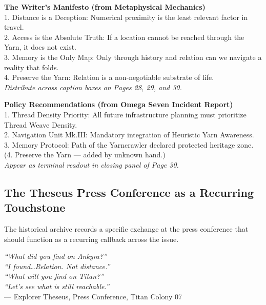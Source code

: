 \documentclass[11pt]{article}
\begin{document}
\begin{archivebox}
\textcolor{archiveGold}{\textbf{The Writer's Manifesto (from Metaphysical Mechanics)}}\\[4pt]
\small
1. Distance is a Deception: Numerical proximity is the least relevant factor in travel.\\
2. Access is the Absolute Truth: If a location cannot be reached through the Yarn, it does not exist.\\
3. Memory is the Only Map: Only through history and relation can we navigate a reality that folds.\\
4. Preserve the Yarn: Relation is a non-negotiable substrate of life.\\[4pt]
\textit{Distribute across caption boxes on Pages 28, 29, and 30.}
\end{archivebox}

\begin{archivebox}
\textcolor{archiveGold}{\textbf{Policy Recommendations (from Omega Seven Incident Report)}}\\[4pt]
\small
1. Thread Density Priority: All future infrastructure planning must prioritize Thread Weave Density.\\
2. Navigation Unit Mk.III: Mandatory integration of Heuristic Yarn Awareness.\\
3. Memory Protocol: Path of the Yarncrawler declared protected heritage zone.\\
(4. Preserve the Yarn --- added by unknown hand.)\\[4pt]
\textit{Appear as terminal readout in closing panel of Page 30.}
\end{archivebox}

\subsection{The Theseus Press Conference as a Recurring Touchstone}

The historical archive records a specific exchange at the press conference that should function as a recurring callback across the issue.

\begin{center}
\begin{mdframed}[linecolor=cyanThread, linewidth=1pt, innerleftmargin=16pt, innerrightmargin=16pt, innertopmargin=10pt, innerbottommargin=10pt]
\textit{``What did you find on Ankyra?''}\\[4pt]
\textit{``I found\ldots Relation. Not distance.''}\\[4pt]
\textit{``What will you find on Titan?''}\\[4pt]
\textit{``Let's see what is still reachable.''}\\[4pt]
--- Explorer Theseus, Press Conference, Titan Colony 07
\end{mdframed}
\end{center}
\end{document}
